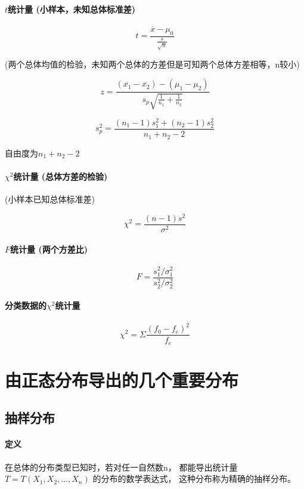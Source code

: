\documentclass[UTF8,10pt]{book}
\begin{document}
            
            \paragraph{$t$统计量  (小样本，未知总体标准差)}

                $$t=\frac{\overline{x}-\mu_0}{\frac{s}{\sqrt{n}}}$$
                
                (两个总体均值的检验，未知两个总体的方差但是可知两个总体方差相等，n较小)

                $$z=\frac{(\overline{x_1}-\overline{x_2})-(\mu_1-\mu_2)}{s_p \sqrt{\frac{1}{n_1}+\frac{1}{n_2}}}$$
            
                $$s_p^2 = \frac{(n_1-1)s_1^2+(n_2-1)s_2^2}{n_1+n_2-2}$$

                自由度为$n_1+n_2-2$
            
            \paragraph{$\chi^2$统计量 (总体方差的检验)}

                (小样本已知总体标准差)

                $$ \chi^2=\frac{(n-1)s^2}{\sigma^2} $$
            
            \paragraph{$F$统计量 (两个方差比)}

                $$F=\frac{{s_1^2}/ {\sigma_1^2}}{{s_2^2}/{\sigma_2^2}}$$
            
            \paragraph{分类数据的$\chi^2$统计量}

                $$\chi^2=\Sigma \frac{(f_0-f_e)^2}{f_e}$$





    \section{由正态分布导出的几个重要分布}
        \subsection{抽样分布}
            \paragraph{定义} 在总体的分布类型已知时，若对任一自然数n，
            都能导出统计量$T = T(X_1,X_2,...,X_n)$
            的分布的数学表达式，
            这种分布称为精确的抽样分布。
            
\end{document}
